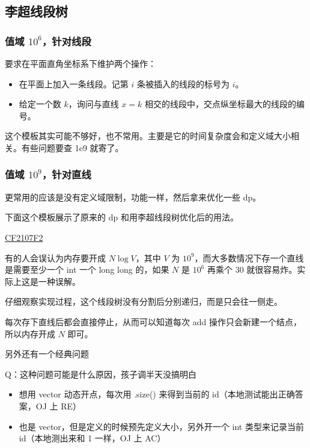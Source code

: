 \subsection{李超线段树}

\subsubsection{值域 $10^6$，针对线段}

要求在平面直角坐标系下维护两个操作：

\begin{itemize}
    \item 在平面上加入一条线段。记第 $i$ 条被插入的线段的标号为 $i$。
    \item 给定一个数 $k$，询问与直线 $x = k$ 相交的线段中，交点纵坐标最大的线段的编号。
\end{itemize}



这个模板其实可能不够好，也不常用。主要是它的时间复杂度会和定义域大小相关。有些问题要查 1e9 就寄了。

\subsubsection{值域 $10^9$，针对直线}

更常用的应该是没有定义域限制，功能一样，然后拿来优化一些 dp。

下面这个模板展示了原来的 dp 和用李超线段树优化后的用法。

\href{https://codeforces.com/contest/2107/problem/F2}{CF2107F2}



有的人会误认为内存要开成 $N\log V$，其中 $V$ 为 $10^9$，而大多数情况下存一个直线是需要至少一个 int 一个 long long 的，如果 $N$ 是 $10^6$ 再乘个 30 就很容易炸。实际上这是一种误解。

仔细观察实现过程，这个线段树没有分割后分别递归，而是只会往一侧走。

每次存下直线后都会直接停止，从而可以知道每次 add 操作只会新建一个结点，所以内存开成 $N$ 即可。

另外还有一个经典问题

Q：这种问题可能是什么原因，孩子调半天没搞明白

\begin{itemize}
    
\item 想用 vector 动态开点，每次用 .size() 来得到当前的 id（本地测试能出正确答案，OJ 上 RE）

\item 也是 vector，但是定义的时候预先定义大小，另外开一个 int 类型来记录当前 id（本地测出来和 1 一样，OJ 上 AC）

\end{itemize}

